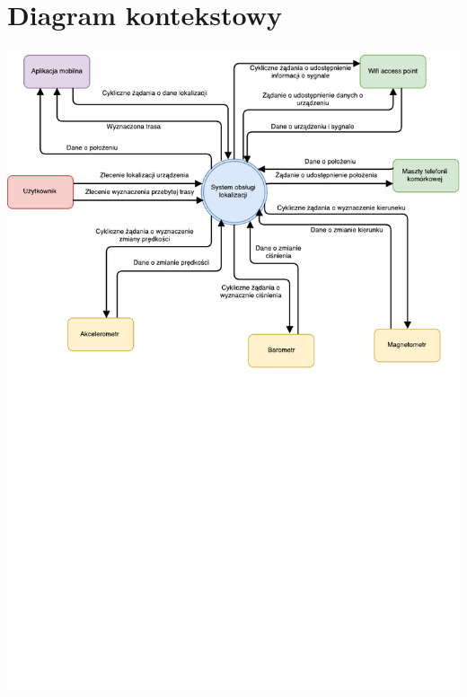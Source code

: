 \documentclass[11pt]{article}
\begin{document}
	\section{Diagram kontekstowy}
    \begin{center}
	\includegraphics[scale=0.9]{DiagramKontekstowy.pdf}
	\end{center}
	\newpage
\end{document}
